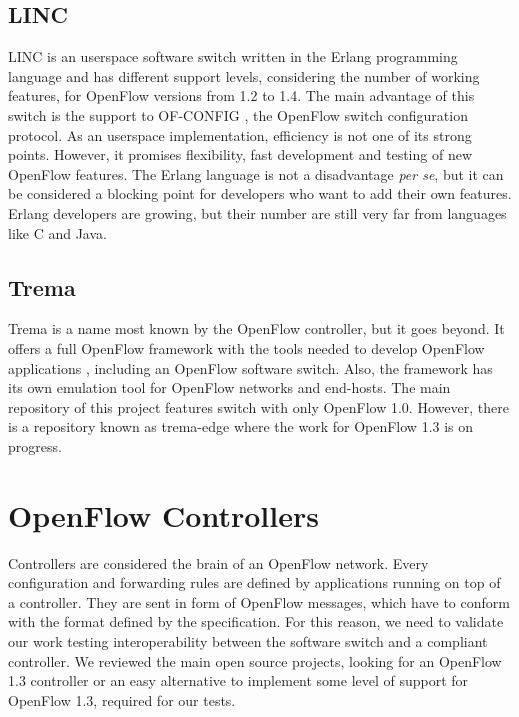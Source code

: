     \subsection{LINC}
    
    LINC \cite{linc} is an userspace software switch written in the Erlang programming language and has different support levels, considering the number of working features, for OpenFlow versions from 1.2 to 1.4. The main advantage of this switch is the support to OF-CONFIG \cite{ofconfig}, the OpenFlow switch configuration protocol. As an userspace implementation, efficiency is not one of its strong points. However, it promises flexibility, fast development and testing of new OpenFlow features. 
    The Erlang language is not a disadvantage \textit{per se}, but it can be considered a blocking point for developers who want to add their own features. Erlang developers are growing, but their number are still very far from languages like C and Java.

    \subsection{Trema}
    
    Trema is a name most known by the OpenFlow controller, but it goes beyond. It offers a full OpenFlow framework with the tools needed to develop OpenFlow applications \cite{trema}, including an OpenFlow software switch. Also, the framework has its own emulation tool for OpenFlow networks and end-hosts. The main repository of this project features switch with only OpenFlow 1.0. However, there is a repository known as trema-edge where the work for OpenFlow 1.3 is on progress.

\section{OpenFlow Controllers}

    Controllers are considered the brain of an OpenFlow network. Every configuration and forwarding rules are defined by applications running on top of a controller. They are sent in form of OpenFlow messages, which have to conform with the format defined by the specification. For this reason, we need to validate our work testing interoperability between the software switch and a compliant controller. We reviewed the main open source projects, looking for an OpenFlow 1.3 controller or an easy alternative to implement some level of support for OpenFlow 1.3, required for our tests. 

